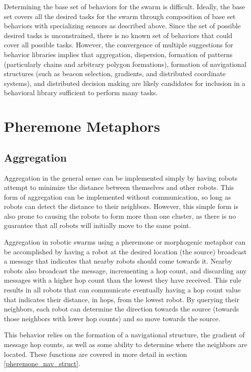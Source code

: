 \documentclass[]{article}
\begin{document}
Determining the base set of behaviors for the swarm is difficult. 
Ideally, the base set covers all the desired tasks for the swarm through composition of base set behaviors with specializing sensors as described above. 
Since the set of possible desired tasks is unconstrained, there is no known set of behaviors that could cover all possible tasks. 
However, the convergence of multiple suggestions for behavior libraries implies that aggregation, dispersion, formation of patterns (particularly chains and arbitrary polygon formations), formation of navigational structures (such as beacon selection, gradients, and distributed coordinate systems), and distributed decision making are likely candidates for inclusion in a behavioral library sufficient to perform many tasks.  

\section{Pheremone Metaphors}

\subsection{Aggregation}

Aggregation in the general sense can be implemented simply by having robots attempt to minimize the distance between themselves and other robots. 
This form of aggregation can be implemented without communication, so long as robots can detect the distance to their neighbors. 
However, this simple form is also prone to causing the robots to form more than one cluster, as there is no guarantee that all robots will initially move to the same point. 

Aggregation in robotic swarms using a pheremone or morphogenic metaphor can be accomplished by having a robot at the desired location (the source) broadcast a message that indicates that nearby robots should come towards it. 
Nearby robots also broadcast the message, incrementing a hop count, and discarding any messages with a higher hop count than the lowest they have received. 
This rule results in all robots that can communicate eventually having a hop count value that indicates their distance, in hops, from the lowest robot. By querying their neighbors, each robot can determine the direction towards the source (towards those neighbors with lower hop counts) and so move towards the source. 

This behavior relies on the formation of a navigational structure, the gradient of message hop counts, as well as some ability to determine where the neighbors are located. These functions are covered in more detail in section \ref{pheremone_nav_struct}.
\end{document}
